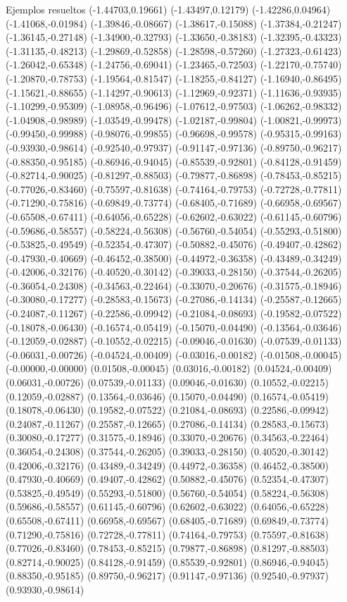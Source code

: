 \documentclass[11pt,a4paper]{article}
\begin{document}
\begin{fmex}{Ejemplos resueltos}
(-1.44703,0.19661) (-1.43497,0.12179) (-1.42286,0.04964) (-1.41068,-0.01984) (-1.39846,-0.08667) (-1.38617,-0.15088) (-1.37384,-0.21247) (-1.36145,-0.27148) (-1.34900,-0.32793) (-1.33650,-0.38183) (-1.32395,-0.43323) (-1.31135,-0.48213) (-1.29869,-0.52858) (-1.28598,-0.57260) (-1.27323,-0.61423) (-1.26042,-0.65348) (-1.24756,-0.69041) (-1.23465,-0.72503) (-1.22170,-0.75740) (-1.20870,-0.78753) (-1.19564,-0.81547) (-1.18255,-0.84127) (-1.16940,-0.86495) (-1.15621,-0.88655) (-1.14297,-0.90613) (-1.12969,-0.92371) (-1.11636,-0.93935) (-1.10299,-0.95309) (-1.08958,-0.96496) (-1.07612,-0.97503) (-1.06262,-0.98332) (-1.04908,-0.98989) (-1.03549,-0.99478) (-1.02187,-0.99804) (-1.00821,-0.99973) (-0.99450,-0.99988) (-0.98076,-0.99855) (-0.96698,-0.99578) (-0.95315,-0.99163) (-0.93930,-0.98614) (-0.92540,-0.97937) (-0.91147,-0.97136) (-0.89750,-0.96217) (-0.88350,-0.95185) (-0.86946,-0.94045) (-0.85539,-0.92801) (-0.84128,-0.91459) (-0.82714,-0.90025) (-0.81297,-0.88503) (-0.79877,-0.86898) (-0.78453,-0.85215) (-0.77026,-0.83460) (-0.75597,-0.81638) (-0.74164,-0.79753) (-0.72728,-0.77811) (-0.71290,-0.75816) (-0.69849,-0.73774) (-0.68405,-0.71689) (-0.66958,-0.69567) (-0.65508,-0.67411) (-0.64056,-0.65228) (-0.62602,-0.63022) (-0.61145,-0.60796) (-0.59686,-0.58557) (-0.58224,-0.56308) (-0.56760,-0.54054) (-0.55293,-0.51800) (-0.53825,-0.49549) (-0.52354,-0.47307) (-0.50882,-0.45076) (-0.49407,-0.42862) (-0.47930,-0.40669) (-0.46452,-0.38500) (-0.44972,-0.36358) (-0.43489,-0.34249) (-0.42006,-0.32176) (-0.40520,-0.30142) (-0.39033,-0.28150) (-0.37544,-0.26205) (-0.36054,-0.24308) (-0.34563,-0.22464) (-0.33070,-0.20676) (-0.31575,-0.18946) (-0.30080,-0.17277) (-0.28583,-0.15673) (-0.27086,-0.14134) (-0.25587,-0.12665) (-0.24087,-0.11267) (-0.22586,-0.09942) (-0.21084,-0.08693) (-0.19582,-0.07522) (-0.18078,-0.06430) (-0.16574,-0.05419) (-0.15070,-0.04490) (-0.13564,-0.03646) (-0.12059,-0.02887) (-0.10552,-0.02215) (-0.09046,-0.01630) (-0.07539,-0.01133) (-0.06031,-0.00726) (-0.04524,-0.00409) (-0.03016,-0.00182) (-0.01508,-0.00045) (-0.00000,-0.00000) (0.01508,-0.00045) (0.03016,-0.00182) (0.04524,-0.00409) (0.06031,-0.00726) (0.07539,-0.01133) (0.09046,-0.01630) (0.10552,-0.02215) (0.12059,-0.02887) (0.13564,-0.03646) (0.15070,-0.04490) (0.16574,-0.05419) (0.18078,-0.06430) (0.19582,-0.07522) (0.21084,-0.08693) (0.22586,-0.09942) (0.24087,-0.11267) (0.25587,-0.12665) (0.27086,-0.14134) (0.28583,-0.15673) (0.30080,-0.17277) (0.31575,-0.18946) (0.33070,-0.20676) (0.34563,-0.22464) (0.36054,-0.24308) (0.37544,-0.26205) (0.39033,-0.28150) (0.40520,-0.30142) (0.42006,-0.32176) (0.43489,-0.34249) (0.44972,-0.36358) (0.46452,-0.38500) (0.47930,-0.40669) (0.49407,-0.42862) (0.50882,-0.45076) (0.52354,-0.47307) (0.53825,-0.49549) (0.55293,-0.51800) (0.56760,-0.54054) (0.58224,-0.56308) (0.59686,-0.58557) (0.61145,-0.60796) (0.62602,-0.63022) (0.64056,-0.65228) (0.65508,-0.67411) (0.66958,-0.69567) (0.68405,-0.71689) (0.69849,-0.73774) (0.71290,-0.75816) (0.72728,-0.77811) (0.74164,-0.79753) (0.75597,-0.81638) (0.77026,-0.83460) (0.78453,-0.85215) (0.79877,-0.86898) (0.81297,-0.88503) (0.82714,-0.90025) (0.84128,-0.91459) (0.85539,-0.92801) (0.86946,-0.94045) (0.88350,-0.95185) (0.89750,-0.96217) (0.91147,-0.97136) (0.92540,-0.97937) (0.93930,-0.98614) 
\end{fmex}
\end{document}
